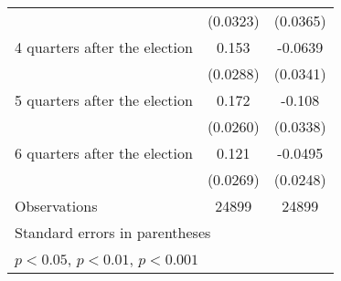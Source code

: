 \begin{table}[htbp]
\begin{tabular}{l*{2}{c}}
                    &    (0.0323)         &    (0.0365)         \\
[1em]
 4 quarters after the election&       0.153\sym{***}&     -0.0639         \\
                    &    (0.0288)         &    (0.0341)         \\
[1em]
 5 quarters after the election&       0.172\sym{***}&      -0.108\sym{**} \\
                    &    (0.0260)         &    (0.0338)         \\
[1em]
 6 quarters after the election&       0.121\sym{***}&     -0.0495\sym{*}  \\
                    &    (0.0269)         &    (0.0248)         \\
\hline
Observations        &       24899         &       24899         \\
\hline\hline
\multicolumn{3}{l}{\footnotesize Standard errors in parentheses}\\
\multicolumn{3}{l}{\footnotesize \sym{*} \(p<0.05\), \sym{**} \(p<0.01\), \sym{***} \(p<0.001\)}\\
\end{tabular}
\end{table}
